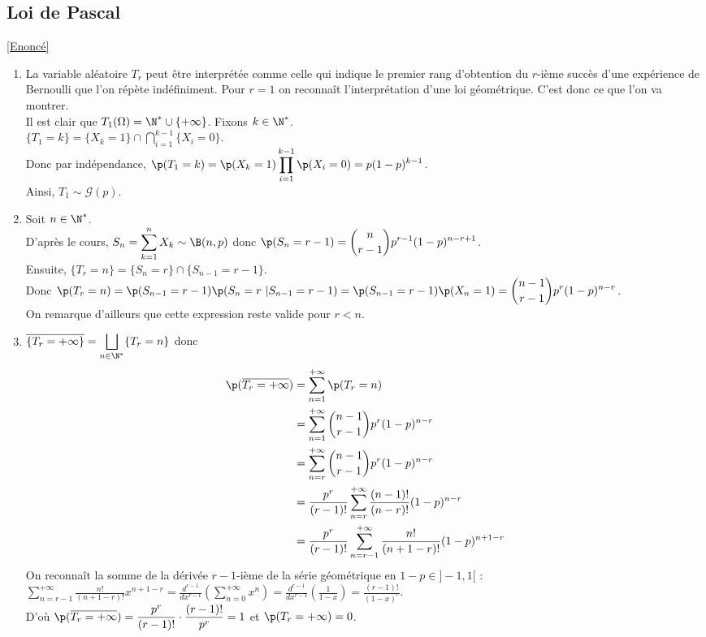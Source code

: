 \documentclass[8pt]{book}
\begin{document}
	\subsection{Loi de Pascal }
	\label{Loi de Pascal corrigé}
		\textcolor{blue}{\hyperref[Loi de Pascal]{[Enoncé]}}\\
	\begin{enumerate}
		\item La variable aléatoire $T_r$ peut être interprétée comme celle qui indique le premier rang d'obtention du $r$-ième succès d'une expérience de Bernoulli que l'on répète indéfiniment. Pour $r=1$ on reconnaît l'interprétation d'une loi géométrique. C'est donc ce que l'on va montrer.\\
		Il est clair que $T_1(\Omega)=\N^*\cup\{+\infty\}$. Fixons $k\in \N^*$.\\
		$\{T_1=k\}=\{X_k=1\}\displaystyle\cap\bigcap\limits_{i=1}^{k-1}\{X_i=0\}$.\\
		Donc par indépendance, $\p(T_1=k)=\p(X_k=1)\displaystyle\prod\limits_{i=1}^{k-1}\p(X_i=0)=p(1-p)^{k-1}$.\\
		Ainsi, $T_1\sim \mathcal{G}(p)$.
		\item Soit $n\in \N^*$.\\
		D'après le cours, $S_n=\displaystyle\sum\limits_{k=1}^nX_k\sim \B(n,p)$ donc $\p(S_n=r-1)=\displaystyle\binom{n}{r-1}p^{r-1}(1-p)^{n-r+1}$.\\
		Ensuite, $\{T_r=n\}=\{S_n=r\}\cap\{S_{n-1}=r-1\}$.\\
		Donc $\p(T_r=n)=\p(S_{n-1}=r-1)\p(S_n=r\ |S_{n-1}=r-1)=\p(S_{n-1}=r-1)\p(X_n=1)=\displaystyle\binom{n-1}{r-1}p^r(1-p)^{n-r}$.\\
		On remarque d'ailleurs que cette expression reste valide pour $r<n$.
		\item $\overline{\{T_r=+\infty\}}=\displaystyle\bigsqcup\limits_{n\in \N^*}\{T_r=n\}$ donc
		\begin{align*}
			\p(\overline{T_r=+\infty})&=\displaystyle\sum\limits_{n=1}^{+\infty}\p(T_r=n)\\
			&=\sum\limits_{n=1}^{+\infty}\binom{n-1}{r-1}p^r(1-p)^{n-r}\\
			&=\sum\limits_{n=r}^{+\infty}\binom{n-1}{r-1}p^r(1-p)^{n-r}\\
			&=\frac{p^r}{(r-1)!}\sum\limits_{n=r}^{+\infty}\frac{(n-1)!}{(n-r)!}(1-p)^{n-r}\\
			&=\frac{p^r}{(r-1)!}\sum\limits_{n=r-1}^{+\infty}\frac{n!}{(n+1-r)!}(1-p)^{n+1-r}
		\end{align*}
		On reconnaît la somme de la dérivée $r-1$-ième de la série géométrique en $1-p\in ]-1,1[$ :\\
		$\displaystyle\sum\limits_{n=r-1}^{+\infty}\frac{n!}{(n+1-r)!}x^{n+1-r}=\frac{d^{r-1}}{dx^{r-1}}\left(\sum\limits_{n=0}^{+\infty}x^n\right)=\displaystyle\frac{d^{r-1}}{dx^{r-1}}\left(\frac{1}{1-x}\right)=\frac{(r-1)!}{(1-x)^r}$.\\
		D'où $\p(\overline{T_r=+\infty})=\displaystyle\frac{p^r}{(r-1)!}\cdot\frac{(r-1)!}{p^r}=1$ et $\p(T_r=+\infty)=0$.
	\end{enumerate}
	
\end{document}
